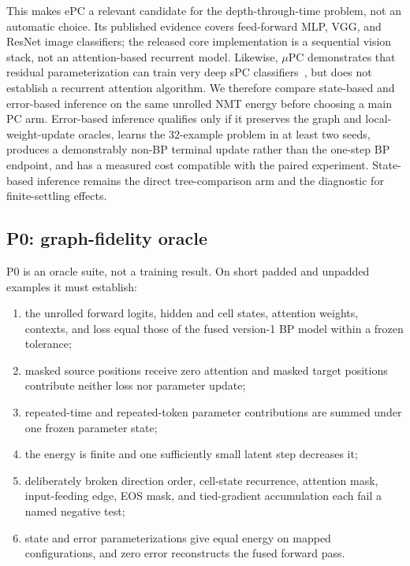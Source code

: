 \documentclass[11pt]{article}
\begin{document}
This makes ePC a relevant candidate for the depth-through-time problem, not an automatic
choice.  Its published evidence covers feed-forward MLP, VGG, and ResNet image classifiers;
the released core implementation is a sequential vision stack, not an attention-based
recurrent model.  Likewise, $\mu$PC demonstrates that residual parameterization can train
very deep sPC classifiers~\cite{innocenti2025mupc}, but does not establish a recurrent
attention algorithm.  We therefore compare state-based and error-based inference on the
same unrolled NMT energy before choosing a main PC arm.  Error-based inference qualifies
only if it preserves the graph and local-weight-update oracles, learns the 32-example
problem in at least two seeds, produces a demonstrably non-BP terminal update rather than
the one-step BP endpoint, and has a measured cost compatible with the paired experiment.
State-based inference remains the direct tree-comparison arm and the diagnostic for
finite-settling effects.

\subsection{P0: graph-fidelity oracle}

P0 is an oracle suite, not a training result.  On short padded and unpadded examples it must
establish:

\begin{enumerate}
  \item the unrolled forward logits, hidden and cell states, attention weights, contexts,
        and loss equal those of the fused version-1 BP model within a frozen tolerance;
  \item masked source positions receive zero attention and masked target positions
        contribute neither loss nor parameter update;
  \item repeated-time and repeated-token parameter contributions are summed under one
        frozen parameter state;
  \item the energy is finite and one sufficiently small latent step decreases it;
  \item deliberately broken direction order, cell-state recurrence, attention mask,
        input-feeding edge, EOS mask, and tied-gradient accumulation each fail a named
        negative test;
  \item state and error parameterizations give equal energy on mapped configurations,
        and zero error reconstructs the fused forward pass.
\end{enumerate}
\end{document}
